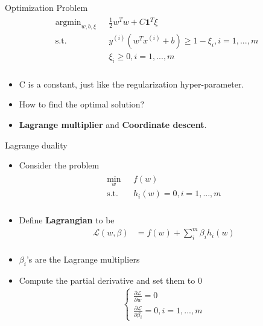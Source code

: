 \documentclass{beamer}
\begin{document}
\begin{frame}{Optimization Problem}
\begin{align}
\begin{split}
\text{argmin}_{w, b, \xi}\text{   }&\frac{1}{2}w^Tw + C\mathbf{1}^T\xi  \\
\text{s.t.} \text{   }&y^{(i)}\left(w^Tx^{(i)} + b\right) \geq 1-\xi_i, i = 1,...,m\\
&\xi_i \geq 0, i = 1,...,m\\
\end{split}
\end{align}
\begin{itemize}
\item C is a constant, just like the regularization hyper-parameter.
\item How to find the optimal solution?
\item \textbf{Lagrange multiplier} and \textbf{Coordinate descent}.
\end{itemize}
\end{frame}

\begin{frame}{Lagrange duality}
\begin{itemize}
\item Consider the problem
\begin{align*}
\begin{split}
\min_w\text{ }&f(w) \\
\text{s.t. }&h_i(w) = 0, i=1,...,m\\
\end{split}
\end{align*}
\item Define \textbf{Lagrangian} to be
\begin{align*}
\mathcal{L}(w, \beta) &= f(w) + \sum_i^m \beta_i h_i(w) \\
\end{align*}
\item $\beta_i$'s are the Lagrange multipliers
\item Compute the partial derivative and set them to 0
\begin{align*}
  \begin{cases}
    \frac{\partial\mathcal{L}}{\partial w} = 0\\
    \frac{\partial\mathcal{L}}{\partial \beta_i} = 0, i=1,...,m
  \end{cases}
\end{align*}
\end{itemize}
\end{frame}
\end{document}
